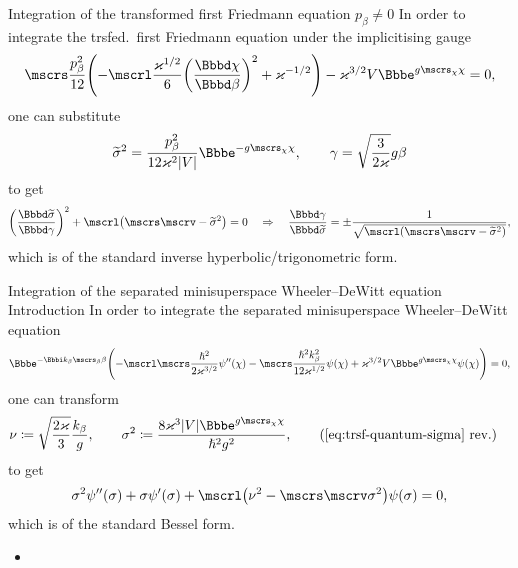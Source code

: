 \documentclass[9pt]{beamer}
\begin{document}
\begin{frame}%
{Integration of the transformed first Friedmann equation}%
{$p_\beta \neq 0$}
In order to integrate the trsfed.\ first Friedmann equation under the
implicitising gauge
\begin{align}
\mscrs\frac{p_\beta^2}{12}\rbr{
-\mscrl\frac{\varkappa^{1/2}}{6}\rbr{\frde{\chi}{\beta}}^2
+\varkappa^{-1/2}}
-\varkappa^{3/2}V\ee^{g\mscrs_\chi\chi} = 0,
\end{align}
one can substitute
\begin{align}
\widetilde{\sigma}^2 = \frac{p_\beta^2}{12\varkappa^2 \vbr{V}}
\ee^{-g\mscrs_\chi\chi},
\qquad
\gamma = \sqrt{\frac{3}{2\varkappa}}g\beta
\end{align}
to get
\begin{align}
\rbr{\frde{\widetilde{\sigma}}{\gamma}}^2
+\mscrl\rbr{\mscrs\mscrv - \widetilde{\sigma}^2} = 0
\quad\Rightarrow\quad
\frde{\gamma}{\widetilde{\sigma}} = \pm
\frac{1}{\sqrt{\mscrl\rbr{\mscrs\mscrv - \widetilde{\sigma}^2}}},
\end{align}
which is of the standard inverse hyperbolic/trigonometric form.
\end{frame}



\begin{frame}%
{Integration of the separated minisuperspace Wheeler--DeWitt equation}%
{Introduction}
In order to integrate the separated minisuperspace Wheeler--DeWitt equation
\begin{align}
\ee^{-\ii k_\beta\mscrs_\beta\beta}\rbr{
-\mscrl\mscrs\frac{\hslash^2}{2\varkappa^{3/2}}\rfun{\psi''}{\chi}
-\mscrs\frac{\hslash^2k_\beta^2}{12\varkappa^{1/2}}\rfun{\psi}{\chi}
+\varkappa^{3/2}V\ee^{g\mscrs_\chi\chi}\rfun{\psi}{\chi}
} = 0,
\end{align}
one can transform
\begin{align}
\nu &\coloneqq \sqrt{\frac{2\varkappa}{3}}\frac{k_\beta}{g},\qquad
\sigma^2 \coloneqq 
\frac{8\varkappa^3\vbr{V}\ee^{g\mscrs_\chi\chi}}{\hslash^2 g^2},
\tag{\ref{eq:trsf-quantum-sigma} rev.}
\end{align}
to get
\begin{align}
\sigma^2\rfun{\psi''}{\sigma}
+\sigma\rfun{\psi'}{\sigma}
+\mscrl\rbr{\nu^2-\mscrs\mscrv\sigma^2}\rfun{\psi}{\sigma} = 0,
\end{align}
which is of the standard Bessel form.
\end{frame}

\begin{itemize}
\item
\end{itemize}
\end{document}
